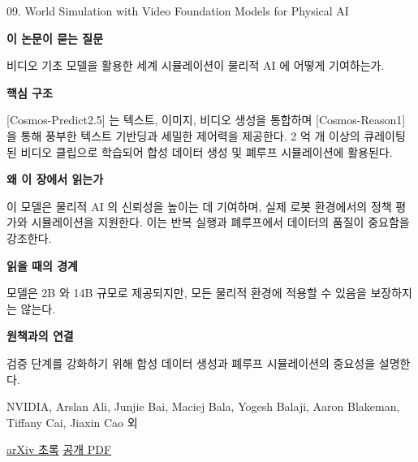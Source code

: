 \documentclass[11pt,openany]{book}
\begin{document}
\begin{termcard}{09. World Simulation with Video Foundation Models for Physical AI}

\par

\medskip

{\sffamily\bfseries\color{deepblue} 이 논문이 묻는 질문}\par

비디오 기초 모델을 활용한 세계 시뮬레이션이 물리적 AI 에 어떻게 기여하는가.

\smallskip

{\sffamily\bfseries\color{deepblue} 핵심 구조}\par

[Cosmos-Predict2.5] 는 텍스트, 이미지, 비디오 생성을 통합하며 [Cosmos-Reason1] 을 통해 풍부한 텍스트 기반딩과 세밀한 제어력을 제공한다. 2 억 개 이상의 큐레이팅된 비디오 클립으로 학습되어 합성 데이터 생성 및 폐루프 시뮬레이션에 활용된다.

\smallskip

{\sffamily\bfseries\color{deepblue} 왜 이 장에서 읽는가}\par

이 모델은 물리적 AI 의 신뢰성을 높이는 데 기여하며, 실제 로봇 환경에서의 정책 평가와 시뮬레이션을 지원한다. 이는 반복 실행과 폐루프에서 데이터의 품질이 중요함을 강조한다.

\smallskip

{\sffamily\bfseries\color{coral} 읽을 때의 경계}\par

모델은 2B 와 14B 규모로 제공되지만, 모든 물리적 환경에 적용할 수 있음을 보장하지는 않는다.

\smallskip

{\sffamily\bfseries\color{teal} 원책과의 연결}\par

검증 단계를 강화하기 위해 합성 데이터 생성과 폐루프 시뮬레이션의 중요성을 설명한다.

\medskip

{\footnotesize\color{muted} NVIDIA, Arslan Ali, Junjie Bai, Maciej Bala, Yogesh Balaji, Aaron Blakeman, Tiffany Cai, Jiaxin Cao 외\par

\href{https://arxiv.org/abs/2511.00062}{arXiv 초록} \quad \href{https://arxiv.org/pdf/2511.00062}{공개 PDF}\par}

\end{termcard}
\end{document}
